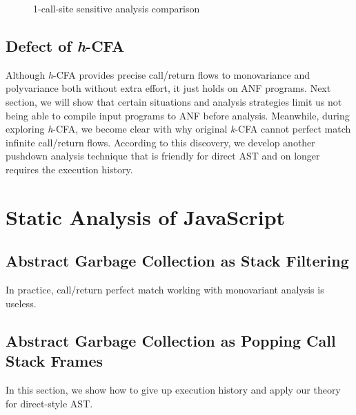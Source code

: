\documentclass{article}
\begin{document}
\begin{figure}[h]
  \small
  \centering
{}
\caption{1-call-site sensitive analysis comparison}
\label{1-benchmark}
\end{figure}

\subsection{Defect of \textit{h}-CFA}
\label{sub:Defect of h-CFA}
Although \textit{h}-CFA provides precise call/return flows to monovariance and polyvariance both without extra effort, it just holds on ANF programs. Next section, we will show that certain situations and analysis strategies limit us not being able to compile input programs to ANF before analysis.
Meanwhile, during exploring \textit{h}-CFA, we become clear with why original \textit{k}-CFA cannot perfect match infinite call/return flows. According to this discovery, we develop another pushdown analysis technique that is friendly for direct AST and on longer requires the execution history.

\section{Static Analysis of JavaScript}
\label{sec:Static Analysis of JavaScript}

\subsection{Abstract Garbage Collection as Stack Filtering}
\label{sub:Abstract Garbage Collection as Stack Filtering}
In practice, call/return perfect match working with monovariant analysis is useless.
\subsection{Abstract Garbage Collection as Popping Call Stack Frames}
\label{sub:Abstract Garbage Collection as Popping Call Stack Frames}
In this section, we show how to give up execution history and apply our theory for direct-style AST\@.
\end{document}
